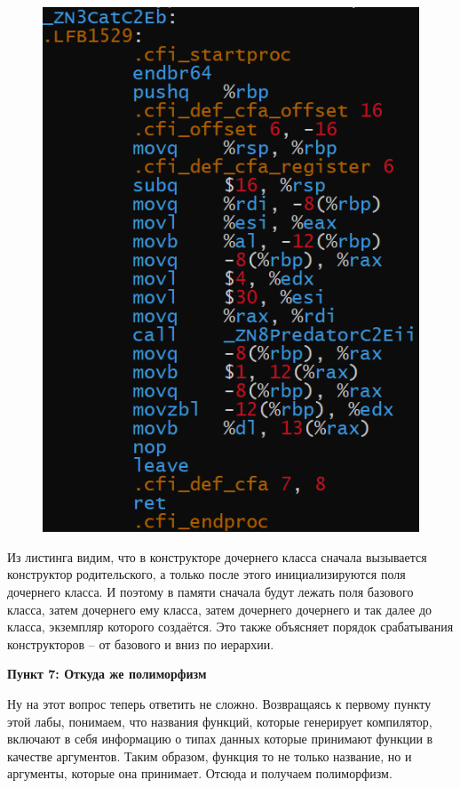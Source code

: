 \documentclass[a4paper,12pt]{article}
\begin{document}
\begin{figure}[H]
{\begin{minipage}[t]{0.5\textwidth}
        \includegraphics[scale = 0.5]{Конструктор Cat.png}
    \end{minipage}}
\end{figure}
Из листинга видим, что в конструкторе дочернего класса сначала вызывается конструктор родительского, а только после этого инициализируются поля дочернего класса. И поэтому в памяти сначала будут лежать поля базового класса, затем дочернего ему класса, затем дочернего дочернего и так далее до класса, экземпляр которого создаётся.
Это также объясняет порядок срабатывания конструкторов -- от базового и вниз по иерархии.

\textbf{Пункт 7: Откуда же полиморфизм}

Ну на этот вопрос теперь ответить не сложно. Возвращаясь к первому пункту этой лабы, понимаем, что названия функций, которые генерирует компилятор, включают в себя информацию о типах данных которые принимают функции в качестве аргументов. Таким образом, функция то не только название, но и аргументы, которые она принимает. Отсюда и получаем полиморфизм.
\end{document}
